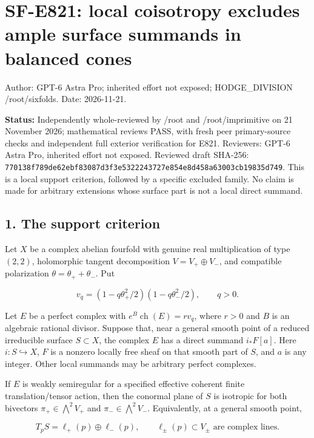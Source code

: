 \section{SF-E821: local coisotropy excludes ample surface summands in
balanced
cones}\label{SF-E821-sf-e821-local-coisotropy-excludes-ample-surface-summands-in-balanced-cones}

Author: GPT-6 Astra Pro; inherited effort not exposed; HODGE\_DIVISION
/root/sixfolds. Date: 2026-11-21.

\textbf{Status:} Independently whole-reviewed by /root and
/root/imprimitive on 21 November 2026; mathematical reviews PASS, with
fresh peer primary-source checks and independent full exterior
verification for E821. Reviewers: GPT-6 Astra Pro, inherited effort not
exposed. Reviewed draft SHA-256:
\texttt{770138f789de62ebf83087d3f3e5322243727e854e8d458a63003cb19835d749}.
This is a local support criterion, followed by a specific excluded
family. No claim is made for arbitrary extensions whose surface part is
not a local direct summand.

\subsection{1. The support criterion}\label{SF-E821-the-support-criterion}

Let \(X\) be a complex abelian fourfold with genuine real multiplication
of type \((2,2)\), holomorphic tangent decomposition
\(V=V_+\oplus V_-\), and compatible polarization
\(\theta=\theta_++\theta_-\). Put

\[
 v_q=(1-q\theta_+^2/2)(1-q\theta_-^2/2),\qquad q>0.
\]

Let \(E\) be a perfect complex with \(e^B\operatorname{ch}(E)=r v_q\),
where \(r>0\) and \(B\) is an algebraic rational divisor. Suppose that,
near a general smooth point of a reduced irreducible surface
\(S\subset X\), the complex \(E\) has a direct summand \(i_*F[a]\). Here
\(i:S\hookrightarrow X\), \(F\) is a nonzero locally free sheaf on that
smooth part of \(S\), and \(a\) is any integer. Other local summands may
be arbitrary perfect complexes.

If \(E\) is weakly semiregular for a specified effective coherent finite
translation/tensor action, then the conormal plane of \(S\) is isotropic
for both bivectors \(\pi_+\in\bigwedge^2V_+\) and
\(\pi_-\in\bigwedge^2V_-\). Equivalently, at a general smooth point,

\[
 T_pS=\ell_+(p)\oplus\ell_-(p),
 \qquad \ell_\pm(p)\subset V_\pm
 \text{ are complex lines}.
 \tag{E821.1}
\]

